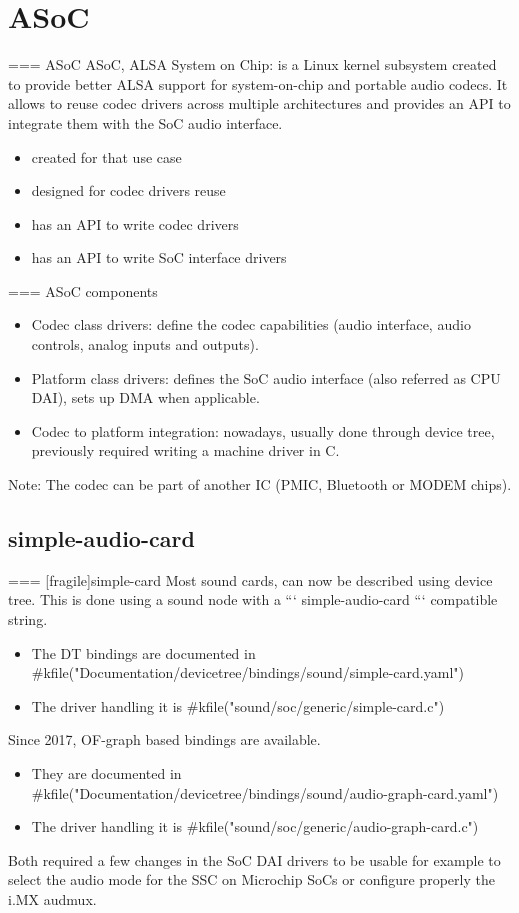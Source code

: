 \section{ASoC}

=== {ASoC}
  ASoC, ALSA System on Chip: is a Linux kernel subsystem created to
  provide better ALSA support for system-on-chip and portable audio
  codecs. It allows to reuse codec drivers across multiple
  architectures and provides an API to integrate them with the SoC
  audio interface.
  \begin{itemize}
  \item created for that use case
  \item designed for codec drivers reuse
  \item has an API to write codec drivers
  \item has an API to write SoC interface drivers
  \end{itemize}


=== {ASoC components}
  \begin{itemize}
  \item Codec class drivers: define the codec capabilities (audio
    interface, audio controls, analog inputs and outputs).
  \item Platform class drivers: defines the SoC audio interface (also
    referred as CPU DAI), sets up DMA when applicable.
  \item Codec to platform integration: nowadays, usually done through
    device tree, previously required writing a machine driver in C.
  \end{itemize}
  Note: The codec can be part of another IC (PMIC, Bluetooth or MODEM
  chips).


\subsection{simple-audio-card}

=== [fragile]{simple-card}
  Most sound cards, can now be described using device tree. This is
  done using a sound node with a ``` simple-audio-card ``` compatible
  string.
  \begin{itemize}
  \item The DT bindings are documented in
    #kfile("Documentation/devicetree/bindings/sound/simple-card.yaml")
  \item The driver handling it is #kfile("sound/soc/generic/simple-card.c")
  \end{itemize}
  Since 2017, OF-graph based bindings are available.
  \begin{itemize}
  \item They are documented in
    #kfile("Documentation/devicetree/bindings/sound/audio-graph-card.yaml")
  \item The driver handling it is #kfile("sound/soc/generic/audio-graph-card.c")
  \end{itemize}
  Both required a few changes in the SoC DAI drivers to be usable for
  example to select the audio mode for the SSC on Microchip SoCs or
  configure properly the i.MX audmux.



